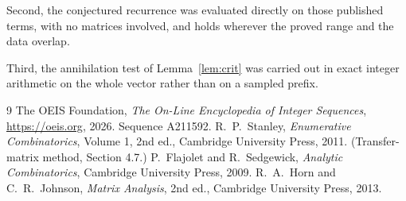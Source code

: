 \documentclass[11pt,a4paper]{article}
\theoremstyle{plain}
\theoremstyle{definition}
\begin{document}
Second, the conjectured recurrence was evaluated directly on those published terms, with no
matrices involved, and holds wherever the proved range and the data overlap.

Third, the annihilation test of Lemma~\ref{lem:crit} was carried out in exact integer
arithmetic on the whole vector rather than on a sampled prefix.

\begin{thebibliography}{9}
 The OEIS Foundation, \emph{The On-Line Encyclopedia of Integer
Sequences}, \url{https://oeis.org}, 2026. Sequence A211592.
 R.~P.~Stanley, \emph{Enumerative Combinatorics}, Volume 1, 2nd ed.,
Cambridge University Press, 2011. (Transfer-matrix method, Section 4.7.)
 P.~Flajolet and R.~Sedgewick, \emph{Analytic Combinatorics}, Cambridge
University Press, 2009.
 R.~A.~Horn and C.~R.~Johnson, \emph{Matrix Analysis}, 2nd ed., Cambridge
University Press, 2013.
\end{thebibliography}
\end{document}
